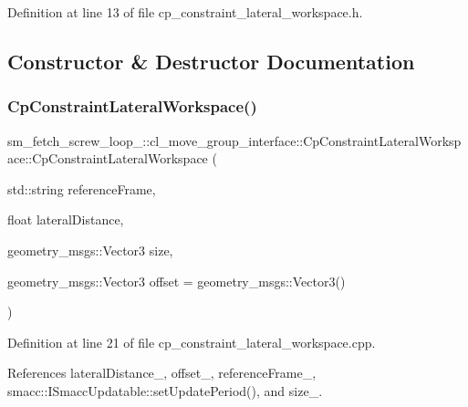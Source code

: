 Definition at line 13 of file cp\+\_\+constraint\+\_\+lateral\+\_\+workspace.\+h.



\subsection{Constructor \& Destructor Documentation}
\mbox{\label{classsm__fetch__screw__loop__1_1_1cl__move__group__interface_1_1CpConstraintLateralWorkspace_a71e7319cbd647941b2df3fe874f93935}} 
\subsubsection{\texorpdfstring{Cp\+Constraint\+Lateral\+Workspace()}{CpConstraintLateralWorkspace()}}
{\footnotesize\ttfamily sm\+\_\+fetch\+\_\+screw\+\_\+loop\+\_\+::cl\+\_\+move\+\_\+group\+\_\+interface\+::\+Cp\+Constraint\+Lateral\+Workspace\+::\+Cp\+Constraint\+Lateral\+Workspace (\begin{DoxyParamCaption}\item[{std\+::string}]{reference\+Frame,  }\item[{float}]{lateral\+Distance,  }\item[{geometry\+\_\+msgs\+::\+Vector3}]{size,  }\item[{geometry\+\_\+msgs\+::\+Vector3}]{offset = {\ttfamily geometry\+\_\+msgs\+:\+:Vector3()} }\end{DoxyParamCaption})}



Definition at line 21 of file cp\+\_\+constraint\+\_\+lateral\+\_\+workspace.\+cpp.



References lateral\+Distance\+\_\+, offset\+\_\+, reference\+Frame\+\_\+, smacc\+::\+I\+Smacc\+Updatable\+::set\+Update\+Period(), and size\+\_\+.


